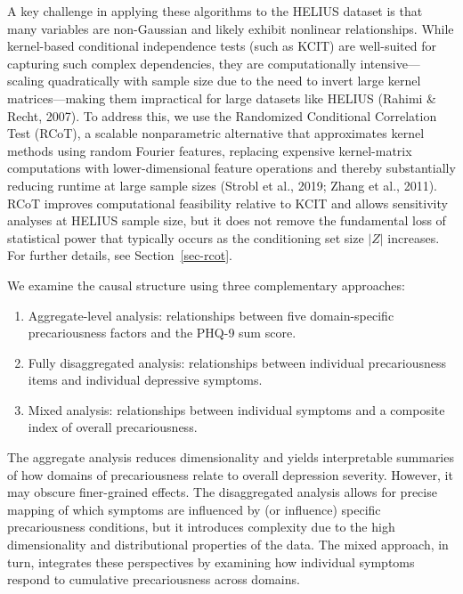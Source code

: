\documentclass[
]{article}
\providecommand{\tightlist}{%
  \setlength{\itemsep}{0pt}\setlength{\parskip}{0pt}}\usepackage{longtable,booktabs,array}
\begin{document}
A key challenge in applying these algorithms to the HELIUS dataset is
that many variables are non-Gaussian and likely exhibit nonlinear
relationships. While kernel-based conditional independence tests (such
as KCIT) are well-suited for capturing such complex dependencies, they
are computationally intensive---scaling quadratically with sample size
due to the need to invert large kernel matrices---making them
impractical for large datasets like HELIUS (Rahimi \& Recht, 2007). To
address this, we use the Randomized Conditional Correlation Test (RCoT),
a scalable nonparametric alternative that approximates kernel methods
using random Fourier features, replacing expensive kernel-matrix
computations with lower-dimensional feature operations and thereby
substantially reducing runtime at large sample sizes (Strobl et al.,
2019; Zhang et al., 2011). RCoT improves computational feasibility
relative to KCIT and allows sensitivity analyses at HELIUS sample size,
but it does not remove the fundamental loss of statistical power that
typically occurs as the conditioning set size \(|Z|\) increases. For
further details, see Section~\ref{sec-rcot}.

We examine the causal structure using three complementary approaches:

\begin{enumerate}
\def\labelenumi{\arabic{enumi}.}
\tightlist
\item
  Aggregate-level analysis: relationships between five domain-specific
  precariousness factors and the PHQ-9 sum score.
\item
  Fully disaggregated analysis: relationships between individual
  precariousness items and individual depressive symptoms.
\item
  Mixed analysis: relationships between individual symptoms and a
  composite index of overall precariousness.
\end{enumerate}

The aggregate analysis reduces dimensionality and yields interpretable
summaries of how domains of precariousness relate to overall depression
severity. However, it may obscure finer-grained effects. The
disaggregated analysis allows for precise mapping of which symptoms are
influenced by (or influence) specific precariousness conditions, but it
introduces complexity due to the high dimensionality and distributional
properties of the data. The mixed approach, in turn, integrates these
perspectives by examining how individual symptoms respond to cumulative
precariousness across domains.
\end{document}

